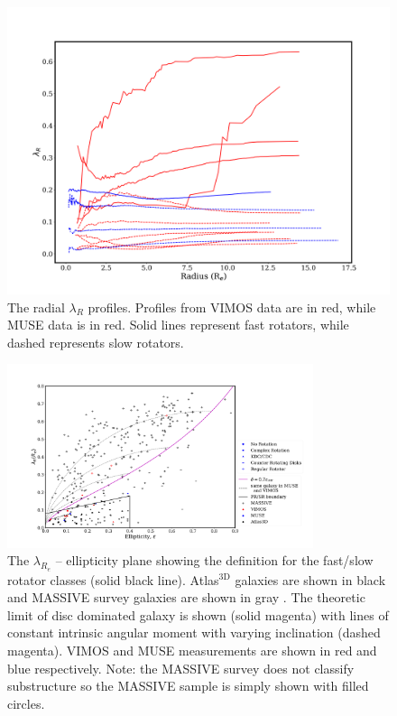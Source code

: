 		\begin{figure}
			\centering
			\includegraphics[width=.7\textwidth]{chapter4/lambda_R.png}
			\caption[$\lambda_{R}$ radial profiles]{The radial $\lambda_{R}$ profiles. Profiles from VIMOS data are in red, while MUSE data is in red. Solid lines represent fast rotators, while dashed represents slow rotators.}
			\label{fig:lambdaR_profile}
		\end{figure}


		\begin{figure}
			\centering
			\includegraphics[width=0.8\textwidth]{chapter4/lambda_R_ellipticity.png}
			\caption[$\lambda_{R_e}$ -- ellipticity plane]{The $\lambda_{R_e}$ -- ellipticity plane showing the definition for the fast/slow rotator classes (solid black line). Atlas$^\text{3D}$ galaxies are shown in black \citep{Emsellem2011} and MASSIVE survey galaxies are shown in gray \citep{Veale2017}. The theoretic limit of disc dominated galaxy is shown (solid magenta) with lines of constant intrinsic angular moment with varying inclination (dashed magenta). VIMOS and MUSE measurements are shown in red and blue respectively. Note: the MASSIVE survey does not classify substructure so the MASSIVE sample is simply shown with filled circles.}
			\label{fig:lambdaR_ellip}
		\end{figure}


